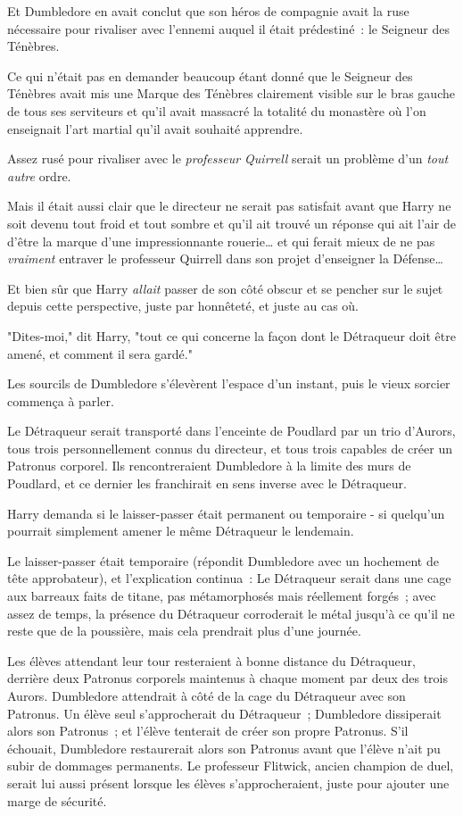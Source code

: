 Et Dumbledore en avait conclut que son héros de compagnie avait la ruse nécessaire pour rivaliser avec l'ennemi auquel il était prédestiné~: le Seigneur des Ténèbres.

Ce qui n'était pas en demander beaucoup étant donné que le Seigneur des Ténèbres avait mis une Marque des Ténèbres clairement visible sur le bras gauche de tous ses serviteurs et qu'il avait massacré la totalité du monastère où l'on enseignait l'art martial qu'il avait souhaité apprendre.

Assez rusé pour rivaliser avec le \emph{professeur Quirrell} serait un problème d'un \emph{tout} \emph{autre} ordre.

Mais il était aussi clair que le directeur ne serait pas satisfait avant que Harry ne soit devenu tout froid et tout sombre et qu'il ait trouvé un réponse qui ait l'air de d'être la marque d'une impressionnante rouerie… et qui ferait mieux de ne pas \emph{vraiment} entraver le professeur Quirrell dans son projet d'enseigner la Défense…

Et bien sûr que Harry \emph{allait} passer de son côté obscur et se pencher sur le sujet depuis cette perspective, juste par honnêteté, et juste au cas où.

"Dites-moi," dit Harry, "tout ce qui concerne la façon dont le Détraqueur doit être amené, et comment il sera gardé."

Les sourcils de Dumbledore s'élevèrent l'espace d'un instant, puis le vieux sorcier commença à parler.

Le Détraqueur serait transporté dans l'enceinte de Poudlard par un trio d'Aurors, tous trois personnellement connus du directeur, et tous trois capables de créer un Patronus corporel. Ils rencontreraient Dumbledore à la limite des murs de Poudlard, et ce dernier les franchirait en sens inverse avec le Détraqueur.

Harry demanda si le laisser-passer était permanent ou temporaire - si quelqu'un pourrait simplement amener le même Détraqueur le lendemain.

Le laisser-passer était temporaire (répondit Dumbledore avec un hochement de tête approbateur), et l'explication continua~: Le Détraqueur serait dans une cage aux barreaux faits de titane, pas métamorphosés mais réellement forgés~; avec assez de temps, la présence du Détraqueur corroderait le métal jusqu'à ce qu'il ne reste que de la poussière, mais cela prendrait plus d'une journée.

Les élèves attendant leur tour resteraient à bonne distance du Détraqueur, derrière deux Patronus corporels maintenus à chaque moment par deux des trois Aurors. Dumbledore attendrait à côté de la cage du Détraqueur avec son Patronus. Un élève seul s'approcherait du Détraqueur~; Dumbledore dissiperait alors son Patronus~; et l'élève tenterait de créer son propre Patronus. S'il échouait, Dumbledore restaurerait alors son Patronus avant que l'élève n'ait pu subir de dommages permanents. Le professeur Flitwick, ancien champion de duel, serait lui aussi présent lorsque les élèves s'approcheraient, juste pour ajouter une marge de sécurité.

